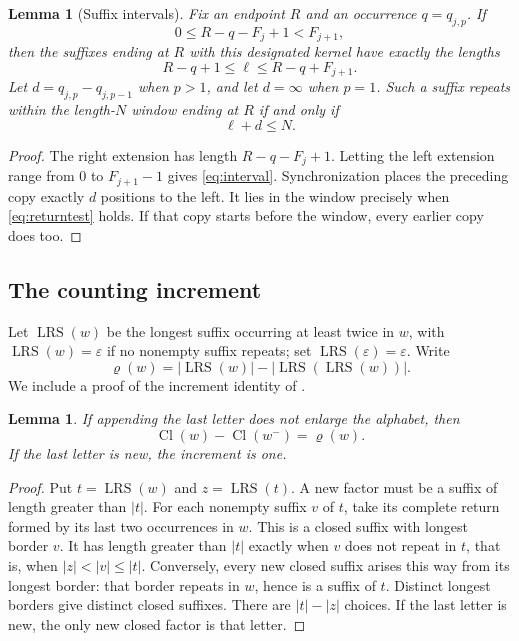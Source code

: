 \documentclass[11pt]{amsart}
\newtheorem{lemma}[theorem]{Lemma}
\newcommand{\Cl}{\operatorname{Cl}}
\newcommand{\LRS}{\operatorname{LRS}}
\newcommand{\Rho}{\varrho}
\newcommand{\eps}{\varepsilon}
\begin{document}
\begin{lemma}[Suffix intervals]\label{lem:returntest}
Fix an endpoint $R$ and an occurrence $q=q_{j,p}$.  If
\[
 0\le R-q-F_j+1<F_{j+1},
\]
then the suffixes ending at $R$ with this designated kernel have exactly
the lengths
\begin{equation}\label{eq:interval}
 R-q+1\le\ell\le R-q+F_{j+1}.
\end{equation}
Let $d=q_{j,p}-q_{j,p-1}$ when $p>1$, and let $d=\infty$ when $p=1$.
Such a suffix repeats within the length-$N$ window ending at $R$ if and
only if
\begin{equation}\label{eq:returntest}
 \ell+d\le N.
\end{equation}
\end{lemma}
\begin{proof}
The right extension has length $R-q-F_j+1$.  Letting the left extension
range from $0$ to $F_{j+1}-1$ gives \eqref{eq:interval}.  Synchronization
places the preceding copy exactly $d$ positions to the left.  It lies in
the window precisely when \eqref{eq:returntest} holds.  If that copy
starts before the window, every earlier copy does too.
\end{proof}

\subsection{The counting increment}
Let $\LRS(w)$ be the longest suffix occurring at least twice in $w$, with
$\LRS(w)=\eps$ if no nonempty suffix repeats; set $\LRS(\eps)=\eps$.
Write
\[
 \Rho(w)=|\LRS(w)|-|\LRS(\LRS(w))|.
\]
We include a proof of the increment identity of
\cite[Lemma 3.1]{MP}.

\begin{lemma}\label{lem:increment}
If appending the last letter does not enlarge the alphabet, then
\begin{equation}\label{eq:increment}
 \Cl(w)-\Cl(w^-)=\Rho(w).
\end{equation}
If the last letter is new, the increment is one.
\end{lemma}
\begin{proof}
Put $t=\LRS(w)$ and $z=\LRS(t)$.  A new factor must be a suffix of
length greater than $|t|$.  For each nonempty suffix $v$ of $t$, take its
complete return formed by its last two occurrences in $w$.  This is a
closed suffix with longest border $v$.  It has length greater than
$|t|$ exactly when $v$ does not repeat in $t$, that is, when
$|z|<|v|\le|t|$.  Conversely, every new closed suffix arises this way
from its longest border: that border repeats in $w$, hence is a suffix
of $t$.  Distinct longest borders give distinct closed suffixes.
There are $|t|-|z|$ choices.  If the last letter is new, the only new
closed factor is that letter.
\end{proof}
\end{document}

